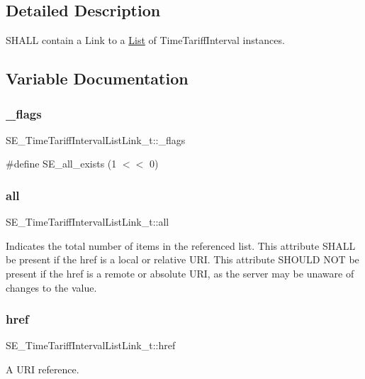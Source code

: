 \subsection{Detailed Description}
S\+H\+A\+LL contain a Link to a \hyperlink{structList}{List} of Time\+Tariff\+Interval instances. 

\subsection{Variable Documentation}
\mbox{\label{group__TimeTariffIntervalListLink_ga2a55ec60c5a306cb112d2d74e49860da}} 
\subsubsection{\texorpdfstring{\+\_\+flags}{\_flags}}
{\footnotesize\ttfamily S\+E\+\_\+\+Time\+Tariff\+Interval\+List\+Link\+\_\+t\+::\+\_\+flags}

\#define S\+E\+\_\+all\+\_\+exists (1 $<$$<$ 0) \mbox{\label{group__TimeTariffIntervalListLink_ga56259e3393d2f64589745a17b0887283}} 
\subsubsection{\texorpdfstring{all}{all}}
{\footnotesize\ttfamily S\+E\+\_\+\+Time\+Tariff\+Interval\+List\+Link\+\_\+t\+::all}

Indicates the total number of items in the referenced list. This attribute S\+H\+A\+LL be present if the href is a local or relative U\+RI. This attribute S\+H\+O\+U\+LD N\+OT be present if the href is a remote or absolute U\+RI, as the server may be unaware of changes to the value. \mbox{\label{group__TimeTariffIntervalListLink_gac4b91b5f652299407cdbb8ba7fe8ccc3}} 
\subsubsection{\texorpdfstring{href}{href}}
{\footnotesize\ttfamily S\+E\+\_\+\+Time\+Tariff\+Interval\+List\+Link\+\_\+t\+::href}

A U\+RI reference. 